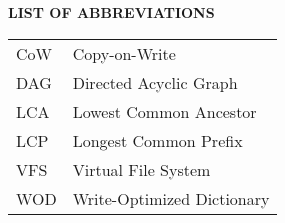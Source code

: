 {}

\begin{center}
\textbf{LIST OF ABBREVIATIONS}
\vspace{16pt}
\end{center}


\noindent
\begin{tabular}{p{0.8in} p{5in}}
CoW     & Copy-on-Write\\
DAG     & Directed Acyclic Graph\\
LCA     & Lowest Common Ancestor\\
LCP     & Longest Common Prefix\\
VFS     & Virtual File System\\
WOD     & Write-Optimized Dictionary\\
\end{tabular}

\clearpage
